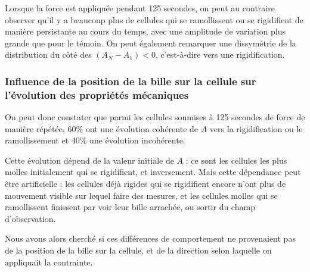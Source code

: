 \documentclass{report}
\begin{document}
Lorsque la force est appliquée pendant 125 secondes, on peut au contraire observer qu'il y a beaucoup plus de cellules qui se ramollissent ou se rigidifient de manière persistante au cours du temps, avec une amplitude de variation plus grande que pour le témoin. On peut également remarquer une dissymétrie de la distribution du côté des $(A_N-A_1)<0$, c’est-à-dire vers une rigidification.

\subsubsection{Influence de la position de la bille sur la cellule sur l'évolution des propriétés mécaniques}

On peut donc constater que parmi les cellules soumises à 125 secondes de force de manière répétée, 60\% ont une évolution cohérente de $A$ vers la rigidification ou le ramollissement et 40\% une évolution incohérente. 

Cette évolution dépend de la valeur initiale de $A$ : ce sont les cellules les plus molles initialement qui se rigidifient, et inversement. Mais cette dépendance peut être artificielle : les cellules déjà rigides qui se rigidifient encore n'ont plus de mouvement visible sur lequel faire des mesures, et les cellules molles qui se ramollissent finissent par voir leur bille arrachée, ou sortir du champ d'observation. 

Nous avons alors cherché si ces différences de comportement ne provenaient pas de la position de la bille sur la cellule, et de la direction selon laquelle on appliquait la contrainte. 

\end{document}
